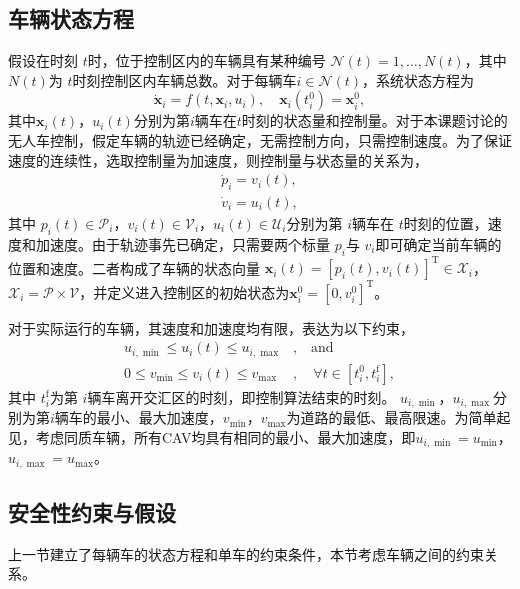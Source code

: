 \subsection{车辆状态方程}
假设在时刻 $t$时，位于控制区内的车辆具有某种编号 $\mathcal{N}(t)={1,\dots,N(t)}$，其中 $N(t)$为 $t$时刻控制区内车辆总数。对于每辆车$i\in \mathcal{N}(t)$，系统状态方程为
\begin{equation}
\dot{\bm{x}}_i=f(t,\bm{x}_i,u_i),\quad \bm{x}_i(t_i^0)=\bm{x}_i^0,
\end{equation}
其中$\bm{x}_i(t)$，$u_i(t)$分别为第$i$辆车在$t$时刻的状态量和控制量。对于本课题讨论的无人车控制，假定车辆的轨迹已经确定，无需控制方向，只需控制速度。为了保证速度的连续性，选取控制量为加速度，则控制量与状态量的关系为，
\begin{equation}
\begin{gathered}
\dot{p}_i=v_i(t),\\
\dot{v}_i=u_i(t),
\end{gathered}
\label{eq:state}
\end{equation}
其中 $p_i(t)\in \mathcal{P}_i$，$v_i(t)\in \mathcal{V}_i$，$u_i(t)\in \mathcal{U}_i$分别为第 $i$辆车在 $t$时刻的位置，速度和加速度。由于轨迹事先已确定，只需要两个标量 $p_i$与 $v_i$即可确定当前车辆的位置和速度。二者构成了车辆的状态向量 $\bm{x}_i(t)=[p_i(t), v_i(t)]^\mathrm{T}\in \mathcal{X}_i$，$\mathcal{X}_i=\mathcal{P}\times\mathcal{V}$，并定义进入控制区的初始状态为$\bm{x}_i^0 = [0, v_i^0]^\mathrm{T}$。

对于实际运行的车辆，其速度和加速度均有限，表达为以下约束，
\begin{equation}
\begin{aligned}
u_{i,\min}\leq u_i(t)\leq u_{i,\max}&, \quad \text{and}\\
0\leq v_{\min}\leq v_i(t)\leq v_{\max}&, \quad \forall t\in[t_i^0, t_i^\mathrm{f}],
\end{aligned}
\label{eq:single_constraint}
\end{equation}
其中 $t_i^\mathrm{f}$为第 $i$辆车离开交汇区的时刻，即控制算法结束的时刻。 $u_{i,\min}$，$u_{i,\max}$分别为第$i$辆车的最小、最大加速度，$v_{\min}$，$v_{\max}$为道路的最低、最高限速。为简单起见，考虑同质车辆，所有CAV均具有相同的最小、最大加速度，即$u_{i,\min}=u_{\min}$，$u_{i,\max}=u_{\max}$。

\subsection{安全性约束与假设}
上一节建立了每辆车的状态方程和单车的约束条件，本节考虑车辆之间的约束关系。


